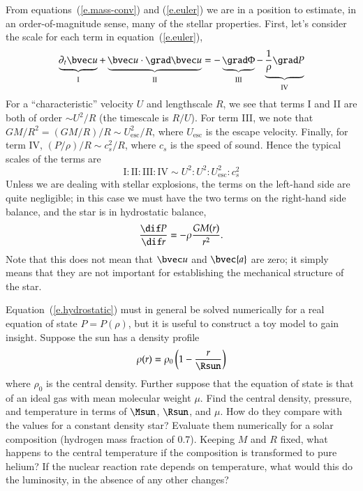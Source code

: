 From equations~(\ref{e.mass-conv}) and (\ref{e.euler}) we are in a position to estimate, in an order-of-magnitude sense, many of the stellar properties.  First, let's consider the scale for each term in equation~(\ref{e.euler}),
\[ \underbrace{\partial_{t}\vu}_{\mathrm{I}} + 
	\underbrace{\vu\cdot\grad\vu}_{\mathrm{II}} = 
	-\underbrace{\grad \Phi}_{\mathrm{III}} - 
	\underbrace{\frac{1}{\rho}\grad P}_{\mathrm{IV}}
\]
For a ``characteristic'' velocity $U$ and lengthscale $R$, we see that terms I and II are both of order $\sim U^{2}/R$ (the timescale is $R/U$).  For term III, we note that $GM/R^{2} = (GM/R)/R \sim U_{\mathrm{esc}}^{2}/R$, where $U_{\mathrm{esc}}$ is the escape velocity.  Finally, for term IV, $(P/\rho)/R \sim c_{s}^{2}/R$, where $c_{s}$ is the speed of sound.  Hence the typical scales of the terms are
\[
\textrm{I} : \textrm{II} : \textrm{III} : \textrm{IV} \sim U^{2} : U^{2} : U_{\mathrm{esc}}^{2} : c_{s}^{2}
\]
Unless we are dealing with stellar explosions, the terms on the left-hand side are quite negligible; in this case we must have the two terms on the right-hand side balance, and the star is in hydrostatic balance, 
\begin{equation}\label{e.hydrostatic}
\frac{\dif P}{\dif r} = -\rho \frac{GM(r)}{r^{2}}.
\end{equation}
Note that this does not mean that $\vu$ and $\bvec{a}$ are zero; it simply means that they are not important for establishing the mechanical structure of the star.

\begin{exercisebox}
Equation~(\ref{e.hydrostatic}) must in general be solved numerically for a real equation of state $P = P(\rho)$, but it is useful to construct a toy model to gain insight.  Suppose the sun has a density profile
\[ \rho(r) = \rho_{0}\left(1-\frac{r}{\Rsun}\right) \]
where $\rho_{0}$ is the central density. Further suppose that the equation of state is that of an ideal gas with mean molecular weight $\mu$.  Find the central density, pressure, and temperature in terms of $\Msun$, $\Rsun$, and $\mu$. How do they compare with the values for a constant density star?  Evaluate them numerically for a solar composition (hydrogen mass fraction of 0.7).  Keeping $M$ and $R$ fixed, what happens to the central temperature if the composition is transformed to pure helium? If the nuclear reaction rate depends on temperature, what would this do the luminosity, in the absence of any other changes?
\end{exercisebox}

